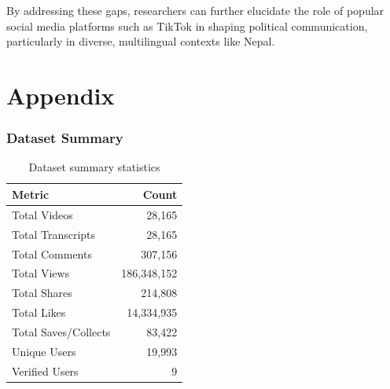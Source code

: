 \documentclass[12pt,a4paper]{report}
\begin{document}
    By addressing these gaps, researchers can further elucidate the role of popular social media platforms such as TikTok in shaping political communication, particularly in diverse, multilingual contexts like Nepal.
\newpage

\clearpage
{} %
\chapter{Appendix}

\subsection*{Dataset Summary}
\begin{table}[htbp]
    \centering
    \begin{tabular}{lr}
        \toprule
        \textbf{Metric} & \textbf{Count} \\
        \midrule
        Total Videos & 28,165 \\
        Total Transcripts & 28,165 \\
        Total Comments & 307,156 \\
        Total Views & 186,348,152 \\
        Total Shares & 214,808 \\
        Total Likes & 14,334,935 \\
        Total Saves/Collects & 83,422 \\
        Unique Users & 19,993 \\
        Verified Users & 9 \\
        \bottomrule
    \end{tabular}
    \caption{Dataset summary statistics}
    \label{tab:dataset_summary}
\end{table}
\clearpage
{}
{}
\end{document}
